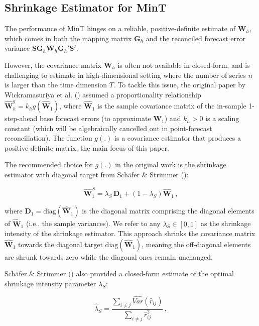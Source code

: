 \documentclass[
  11pt,
  letterpaper,
  DIV=11,
  numbers=noendperiod,
  titlepage]{scrartcl}
\begin{document}
\subsection{Shrinkage Estimator for
MinT}\label{shrinkage-estimator-for-mint}

The performance of MinT hinges on a reliable, positive-definite estimate
of \(\boldsymbol{W}_h\), which comes in both the mapping matrix
\(\boldsymbol{G}_h\) and the reconciled forecast error variance
\(\boldsymbol{S} \boldsymbol{G}_h \boldsymbol{W}_h \boldsymbol{G}_h' \boldsymbol{S}'\).

However, the covariance matrix \(\boldsymbol{W}_h\) is often not
available in closed-form, and is challenging to estimate in
high-dimensional setting where the number of series \(n\) is larger than
the time dimension \(T\). To tackle this issue, the original paper by
Wickramasuriya et al. ()
assumed a proportionality relationship
\(\hat{\boldsymbol{W}}^g_h = k_h g( \hat{\boldsymbol{W}}_1 )\), where
\(\hat{\boldsymbol{W}}_1\) is the sample covariance matrix of the
in-sample 1-step-ahead base forecast errors (to approximate
\(\boldsymbol{W}_1\)) and \(k_h > 0\) is a scaling constant (which will
be algebraically cancelled out in point-forecast reconciliation). The
function \(g(.)\) is a covariance estimator that produces a
positive-definite matrix, the main focus of this paper.

The recommended choice for \(g(.)\) in the original work is the
shrinkage estimator with diagonal target from Schäfer \& Strimmer
():

\[
\hat{\boldsymbol{W}}^{S}_{1} = \lambda_S \, \boldsymbol{D}_1 + (1 - \lambda_S) \hat{\boldsymbol{W}}_1 \, ,
\]

where \(\boldsymbol{D}_1 = \text{diag}( \hat{\boldsymbol{W}}_1 )\) is
the diagonal matrix comprising the diagonal elements of
\(\hat{\boldsymbol{W}}_1\) (i.e., the sample variances). We refer to any
\(\lambda_S \in [0,1]\) as the shrinkage intensity of the shrinkage
estimator. This approach shrinks the covariance matrix
\(\hat{\boldsymbol{W}}_1\) towards the diagonal target
\(\text{diag}( \hat{\boldsymbol{W}}_1 )\), meaning the off-diagonal
elements are shrunk towards zero while the diagonal ones remain
unchanged.

Schäfer \& Strimmer () also provided
a closed-form estimate of the optimal shrinkage intensity parameter
\(\lambda_S\):

\[
\hat{\lambda}_S = \frac{\sum_{i \neq j} \widehat{Var}(\hat{r}_{ij})} 
{\sum_{i \neq j} \hat{r}_{ij}^2} \, ,
\]
\end{document}
